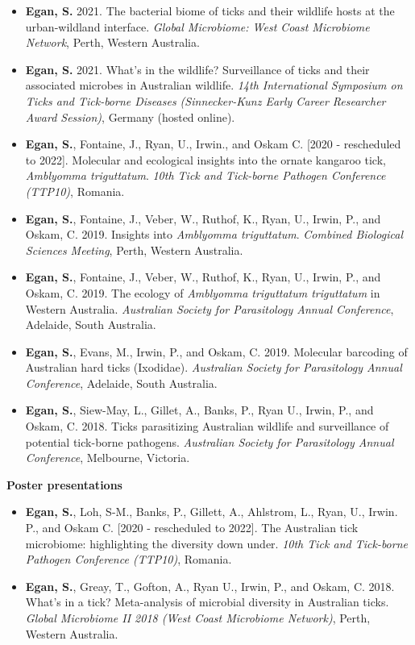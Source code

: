 \documentclass[a4paper, nobind]{templates/ociamthesis}
\begin{document}
\begin{itemize}
\item
  \textbf{Egan, S.} 2021. The bacterial biome of ticks and their wildlife hosts at the urban-wildland interface. \emph{Global Microbiome: West Coast Microbiome Network}, Perth, Western Australia.
\item
  \textbf{Egan, S.} 2021. What's in the wildlife? Surveillance of ticks and their associated microbes in Australian wildlife. \emph{14th International Symposium on Ticks and Tick-borne Diseases (Sinnecker-Kunz Early Career Researcher Award Session)}, Germany (hosted online).
\item
  \textbf{Egan, S.}, Fontaine, J., Ryan, U., Irwin., and Oskam C. {[}2020 - rescheduled to 2022{]}. Molecular and ecological insights into the ornate kangaroo tick, \emph{Amblyomma triguttatum}. \emph{10th Tick and Tick-borne Pathogen Conference (TTP10)}, Romania.
\item
  \textbf{Egan, S.}, Fontaine, J., Veber, W., Ruthof, K., Ryan, U., Irwin, P., and Oskam, C. 2019. Insights into \emph{Amblyomma triguttatum}. \emph{Combined Biological Sciences Meeting}, Perth, Western Australia.
\item
  \textbf{Egan, S.}, Fontaine, J., Veber, W., Ruthof, K., Ryan, U., Irwin, P., and Oskam, C. 2019. The ecology of \emph{Amblyomma triguttatum triguttatum} in Western Australia. \emph{Australian Society for Parasitology Annual Conference}, Adelaide, South Australia.
\item
  \textbf{Egan, S.}, Evans, M., Irwin, P., and Oskam, C. 2019. Molecular barcoding of Australian hard ticks (Ixodidae). \emph{Australian Society for Parasitology Annual Conference}, Adelaide, South Australia.
\item
  \textbf{Egan, S.}, Siew-May, L., Gillet, A., Banks, P., Ryan U., Irwin, P., and Oskam, C. 2018. Ticks parasitizing Australian wildlife and surveillance of potential tick-borne pathogens. \emph{Australian Society for Parasitology Annual Conference}, Melbourne, Victoria.
\end{itemize}

\textbf{Poster presentations}

\begin{itemize}
\item
  \textbf{Egan, S.}, Loh, S-M., Banks, P., Gillett, A., Ahlstrom, L., Ryan, U., Irwin. P., and Oskam C. {[}2020 - rescheduled to 2022{]}. The Australian tick microbiome: highlighting the diversity down under. \emph{10th Tick and Tick-borne Pathogen Conference (TTP10)}, Romania.
\item
  \textbf{Egan, S.}, Greay, T., Gofton, A., Ryan U., Irwin, P., and Oskam, C. 2018. What's in a tick? Meta-analysis of microbial diversity in Australian ticks. \emph{Global Microbiome II 2018 (West Coast Microbiome Network)}, Perth, Western Australia.
\end{itemize}
\end{document}
